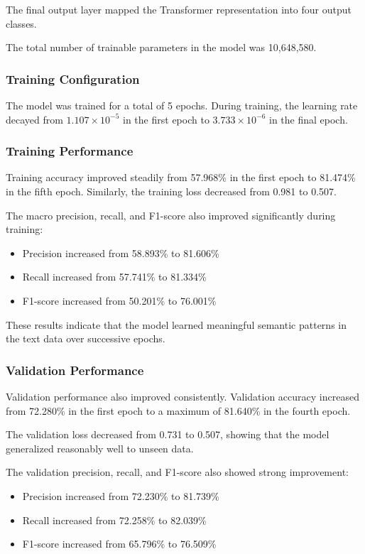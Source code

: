 \documentclass{ieeeaccess}
\begin{document}
The final output layer mapped the Transformer representation into four output classes.

The total number of trainable parameters in the model was 10,648,580.

\subsubsection{Training Configuration}

The model was trained for a total of 5 epochs. During training, the learning rate decayed from $1.107 \times 10^{-5}$ in the first epoch to $3.733 \times 10^{-6}$ in the final epoch.

\subsubsection{Training Performance}

Training accuracy improved steadily from 57.968\% in the first epoch to 81.474\% in the fifth epoch. Similarly, the training loss decreased from 0.981 to 0.507.

The macro precision, recall, and F1-score also improved significantly during training:

\begin{itemize}
    \item Precision increased from 58.893\% to 81.606\%
    \item Recall increased from 57.741\% to 81.334\%
    \item F1-score increased from 50.201\% to 76.001\%
\end{itemize}

These results indicate that the model learned meaningful semantic patterns in the text data over successive epochs.

\subsubsection{Validation Performance}

Validation performance also improved consistently. Validation accuracy increased from 72.280\% in the first epoch to a maximum of 81.640\% in the fourth epoch.

The validation loss decreased from 0.731 to 0.507, showing that the model generalized reasonably well to unseen data.

The validation precision, recall, and F1-score also showed strong improvement:

\begin{itemize}
    \item Precision increased from 72.230\% to 81.739\%
    \item Recall increased from 72.258\% to 82.039\%
    \item F1-score increased from 65.796\% to 76.509\%
\end{itemize}
\end{document}
